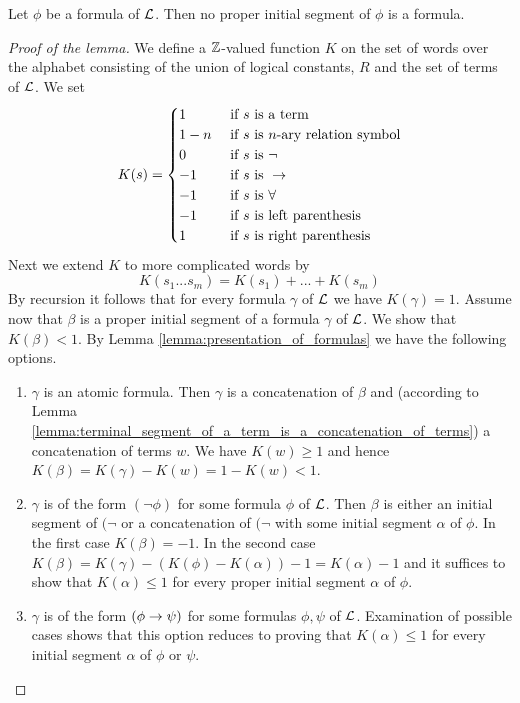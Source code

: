 \documentclass[10pt]{amsart}
\begin{document}
\begin{lemma}\label{lemma:no_formula_is_a_proper_initial_segment_of_any_other_formula}
	Let $\phi$ be a formula of ${\mathcal L}$. Then no proper initial segment of $\phi$ is a formula.
\end{lemma}
\begin{proof}[Proof of the lemma]
	We define a ${\mathbb Z}$-valued function $K$ on the set of words over the alphabet consisting of the union of logical constants, $R$ and the set of terms of ${\mathcal L}$. We set
	$$K(s) = \begin{cases}
			1   & \mbox{ if }s\mbox{ is a term}                  \\
			1-n & \mbox{ if }s\mbox{ is $n$-ary relation symbol} \\
			0   & \mbox{ if }s\mbox{ is }\neg                    \\
			-1  & \mbox{ if }s\mbox{ is }\rightarrow                     \\
			-1  & \mbox{ if }s\mbox{ is }\forall                 \\
			-1  & \mbox{ if }s\mbox{ is left parenthesis}        \\
			1   & \mbox{ if }s\mbox{ is right parenthesis}       \\
		\end{cases}$$
	Next we extend $K$ to more complicated words by
	$$K(s_1...s_m) = K(s_1) +...+ K(s_m)$$
	By recursion it follows that for every formula $\gamma$ of ${\mathcal L}$ we have $K(\gamma) = 1$. Assume now that $\beta$ is a proper initial segment of a formula $\gamma$ of ${\mathcal L}$. We show that $K(\beta) < 1$. By Lemma \ref{lemma:presentation_of_formulas} we have the following options.
	\begin{enumerate}[label=\textbf{(\arabic*)}, leftmargin=3.0em]
		\item $\gamma$ is an atomic formula. Then $\gamma$ is a concatenation of $\beta$ and (according to Lemma \ref{lemma:terminal_segment_of_a_term_is_a_concatenation_of_terms}) a concatenation of terms $w$. We have $K(w) \geq 1$ and hence $K(\beta) = K(\gamma)- K(w) = 1 - K(w) < 1$.
		\item $\gamma$ is of the form $(\neg \phi)$ for some formula $\phi$ of ${\mathcal L}$. Then $\beta$ is either an initial segment of $(\neg$ or a concatenation of $(\neg$ with some initial segment $\alpha$ of $\phi$. In the first case $K(\beta) = -1$. In the second case $K(\beta) = K(\gamma) - (K(\phi) - K(\alpha)) -1 = K(\alpha)-1$ and it suffices to show that $K(\alpha) \leq 1$ for every proper initial segment $\alpha$ of $\phi$.
		\item $\gamma$ is of the form $(\phi \rightarrow \psi)$ for some formulas $\phi, \psi$ of ${\mathcal L}$. Examination of possible cases shows that this option reduces to proving that $K(\alpha) \leq 1$ for every initial segment $\alpha$ of $\phi$ or $\psi$.

\end{enumerate}
\end{proof}
\end{document}
